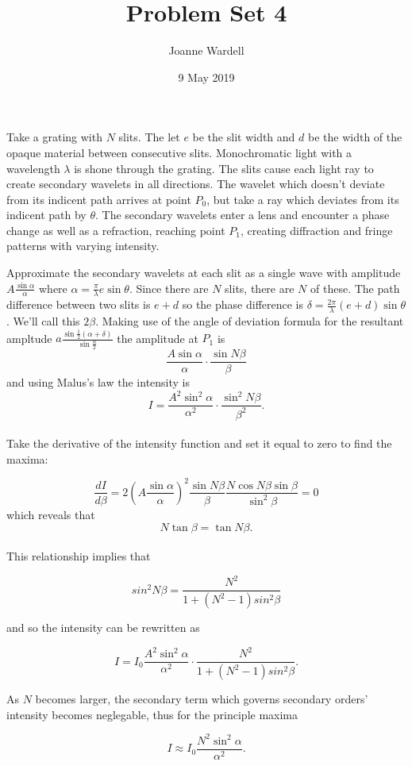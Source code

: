 \documentclass[12pt]{article}
\title{Problem Set 4}
\author{\vspace{-2.0cm}Joanne Wardell}
\date{9 May 2019}
\begin{document}
\maketitle


Take a grating with $N$ slits. The let $e$ be the slit width and $d$ be the width of the opaque material between consecutive slits. Monochromatic light with a wavelength $\lambda$ is shone through the grating. The slits cause each light ray to create secondary wavelets in all directions. The wavelet which doesn't deviate from its indicent path arrives at point $P_{0}$, but take a ray which deviates from its indicent path by $\theta$. The secondary wavelets enter a lens and encounter a phase change as well as a refraction, reaching point $P_{1}$, creating diffraction and fringe patterns with varying intensity.

Approximate the secondary wavelets at each slit as a single wave with amplitude $A\frac{\sin{\alpha}}{\alpha}$ where $\alpha = \frac{\pi}{\lambda}e\sin{\theta}$. Since there are $N$ slits, there are $N$ of these. The path difference between two slits is $e + d$ so the phase difference is $\delta = \frac{2\pi}{\lambda}(e+d)\sin{\theta}$. We'll call this $2\beta$. Making use of the angle of deviation formula for the resultant ampltude $a\frac{\sin{\frac{1}{2}(\alpha + \delta)}}{\sin{\frac{\alpha}{2}}}$ the amplitude at $P_{1}$ is \\
\[\frac{A\sin{\alpha}}{\alpha}\cdot\frac{\sin{N \beta}}{\beta}\]
and using Malus's law the intensity is 
\[I = \frac{A^{2}\sin^{2}{\alpha}}{\alpha^{2}}\cdot\frac{\sin^{2}{N \beta}}{\beta^{2}}\text{.}\]\\

\noindent Take the derivative of the intensity function and set it equal to zero to find the maxima:

\[\frac{dI}{d\beta} = 2(A\frac{\sin{\alpha}}{\alpha})^{2}\frac{\sin{N\beta}}{\beta}\frac{N\cos{N\beta}\sin{\beta}}{\sin^{2}{\beta}}=0\]
which reveals that 
\[N\tan{\beta} = \tan{N\beta}\text{.}\]\\

\noindent This relationship implies that

\[sin^{2}{N\beta} = \frac{N^{2}}{1 + (N^{2}-1)sin^{2}{\beta}}\]

\noindent and so the intensity can be rewritten as

\[I = I_{0}\frac{A^{2}\sin^{2}{\alpha}}{\alpha^{2}}\cdot \frac{N^{2}}{1 + (N^{2}-1)sin^{2}{\beta}}\text{.}\]

\noindent As $N$ becomes larger, the secondary term which governs secondary orders' intensity becomes neglegable, thus for the principle maxima

\[I \approx I_{0}\frac{N^{2}\sin^{2}{\alpha}}{\alpha^{2}}\text{.}\]
\end{document}
